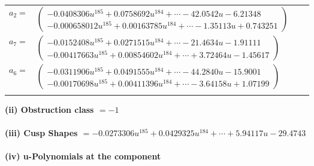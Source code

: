 \documentclass[1p]{elsarticle_modified}
\theoremstyle{definition}
\begin{document}
\begin{tabular}{m{7pt} m{180pt} m{7pt} m{180pt} }
\flushright $a_{2}=$&$\begin{pmatrix}-0.0408306 u^{185}+0.0758692 u^{184}+\cdots-42.0542 u-6.21348\\-0.000658012 u^{185}+0.00163785 u^{184}+\cdots-1.35113 u+0.743251\end{pmatrix}$ \\
\flushright $a_{7}=$&$\begin{pmatrix}-0.0152408 u^{185}+0.0271515 u^{184}+\cdots-21.4634 u-1.91111\\-0.00417663 u^{185}+0.00854602 u^{184}+\cdots+3.72464 u-1.45617\end{pmatrix}$ \\
\flushright $a_{6}=$&$\begin{pmatrix}-0.0311906 u^{185}+0.0491555 u^{184}+\cdots-44.2840 u-15.9001\\-0.00170698 u^{185}+0.00411396 u^{184}+\cdots-3.64158 u+1.07199\end{pmatrix}$\\&\end{tabular}
\flushleft \textbf{(ii) Obstruction class $= -1$}\\~\\
\flushleft \textbf{(iii) Cusp Shapes $= -0.0273306 u^{185}+0.0429325 u^{184}+\cdots+5.94117 u-29.4743$}\\~\\
\newpage\renewcommand{\arraystretch}{1}
\flushleft \textbf{(iv) u-Polynomials at the component}\newline \\
\end{document}
